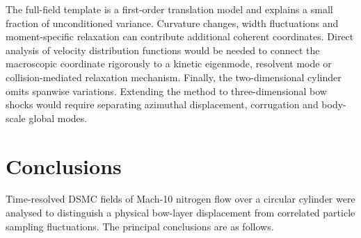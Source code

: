 \documentclass[paper]{JFM-FLM_Au}
\begin{document}
The full-field template is a first-order translation model and explains a small fraction of unconditioned variance. Curvature changes, width fluctuations and moment-specific relaxation can contribute additional coherent coordinates. Direct analysis of velocity distribution functions would be needed to connect the macroscopic coordinate rigorously to a kinetic eigenmode, resolvent mode or collision-mediated relaxation mechanism. Finally, the two-dimensional cylinder omits spanwise variations. Extending the method to three-dimensional bow shocks would require separating azimuthal displacement, corrugation and body-scale global modes.

\section{Conclusions}
Time-resolved DSMC fields of Mach-10 nitrogen flow over a circular cylinder were analysed to distinguish a physical bow-layer displacement from correlated particle sampling fluctuations. The principal conclusions are as follows.
\end{document}
